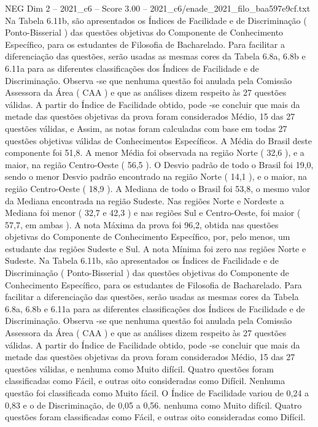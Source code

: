 \begin{textsample}{NEG Dim 2 – 2021\_c6 – Score 3.00 – 2021\_c6/enade\_2021\_filo\_baa597e9cf.txt}
Na Tabela 6.11b, são apresentados os Índices de Facilidade e de Discriminação ( Ponto-Bisserial ) das questões objetivas do Componente de Conhecimento Específico, para os estudantes de Filosofia de Bacharelado.
Para facilitar a diferenciação das questões, serão usadas as mesmas cores da Tabela 6.8a, 6.8b e 6.11a para as diferentes classificações dos Índices de Facilidade e de Discriminação.
Observa -se que nenhuma questão foi anulada pela Comissão Assessora da Área ( CAA ) e que as análises dizem respeito às 27 questões válidas.
A partir do Índice de Facilidade obtido, pode -se concluir que mais da metade das questões objetivas da prova foram considerados Médio, 15 das 27 questões válidas, e Assim, as notas foram calculadas com base em todas 27 questões objetivas válidas de Conhecimentos Específicos.
A Média do Brasil deste componente foi 51,8.
A menor Média foi observada na região Norte ( 32,6 ), e a maior, na região Centro-Oeste ( 56,5 ).
O Desvio padrão de todo o Brasil foi 19,0, sendo o menor Desvio padrão encontrado na região Norte ( 14,1 ), e o maior, na região Centro-Oeste ( 18,9 ).
A Mediana de todo o Brasil foi 53,8, o mesmo valor da Mediana encontrada na região Sudeste.
Nas regiões Norte e Nordeste a Mediana foi menor ( 32,7 e 42,3 ) e nas regiões Sul e Centro-Oeste, foi maior ( 57,7, em ambas ).
A nota Máxima da prova foi 96,2, obtida nas questões objetivas do Componente de Conhecimento Específico, por, pelo menos, um estudante das regiões Sudeste e Sul.
A nota Mínima foi zero nas regiões Norte e Sudeste.
Na Tabela 6.11b, são apresentados os Índices de Facilidade e de Discriminação ( Ponto-Bisserial ) das questões objetivas do Componente de Conhecimento Específico, para os estudantes de Filosofia de Bacharelado.
Para facilitar a diferenciação das questões, serão usadas as mesmas cores da Tabela 6.8a, 6.8b e 6.11a para as diferentes classificações dos Índices de Facilidade e de Discriminação.
Observa -se que nenhuma questão foi anulada pela Comissão Assessora da Área ( CAA ) e que as análises dizem respeito às 27 questões válidas.
A partir do Índice de Facilidade obtido, pode -se concluir que mais da metade das questões objetivas da prova foram considerados Médio, 15 das 27 questões válidas, e nenhuma como Muito difícil.
Quatro questões foram classificadas como Fácil, e outras oito consideradas como Difícil.
Nenhuma questão foi classificada como Muito fácil.
O Índice de Facilidade variou de 0,24 a 0,83 e o de Discriminação, de 0,05 a 0,56. nenhuma como Muito difícil.
Quatro questões foram classificadas como Fácil, e outras oito consideradas como Difícil.

\end{textsample}
